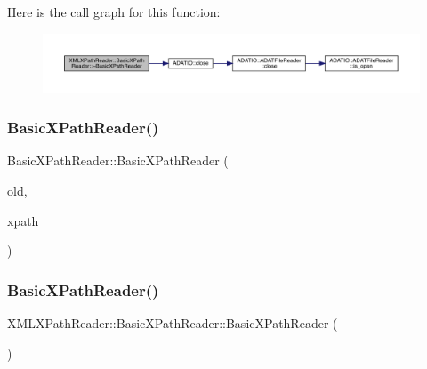 Here is the call graph for this function\+:\nopagebreak
\begin{figure}[H]
\begin{center}
\leavevmode
\includegraphics[width=350pt]{d6/dbf/classXMLXPathReader_1_1BasicXPathReader_ad741466e0f48892e36f19472db5abf52_cgraph}
\end{center}
\end{figure}
\mbox{\label{classXMLXPathReader_1_1BasicXPathReader_ae0a95bb52d6b3691662663070f77f47f}} 
\subsubsection{\texorpdfstring{BasicXPathReader()}{BasicXPathReader()}\hspace{0.1cm}{\footnotesize\ttfamily [4/8]}}
{\footnotesize\ttfamily Basic\+X\+Path\+Reader\+::\+Basic\+X\+Path\+Reader (\begin{DoxyParamCaption}\item[{\mbox{\hyperlink{classXMLXPathReader_1_1BasicXPathReader}{Basic\+X\+Path\+Reader}} \&}]{old,  }\item[{const std\+::string \&}]{xpath }\end{DoxyParamCaption})}

\mbox{\label{classXMLXPathReader_1_1BasicXPathReader_aeb14ab4d5064a3d2f5e0be7b41da1ab4}} 
\subsubsection{\texorpdfstring{BasicXPathReader()}{BasicXPathReader()}\hspace{0.1cm}{\footnotesize\ttfamily [5/8]}}
{\footnotesize\ttfamily X\+M\+L\+X\+Path\+Reader\+::\+Basic\+X\+Path\+Reader\+::\+Basic\+X\+Path\+Reader (\begin{DoxyParamCaption}\item[{void}]{ }\end{DoxyParamCaption})}

